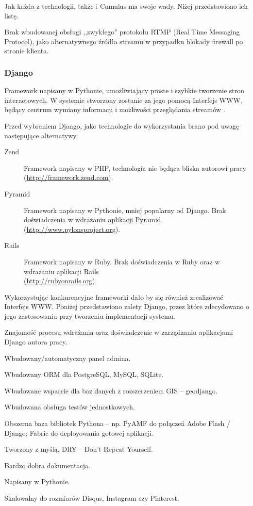 Jak każda z technologii, także i Cumulus ma swoje wady. Niżej przedstawiono ich listę.
\begin{packed_item}
    \item{Brak wbudowanej obsługi ,,zwykłego'' protokołu RTMP (Real Time Messaging Protocol), jako alternatywnego źródła streamu w przypadku blokady firewall po stronie klienta.}
\end{packed_item}

\newpage
\subsubsection{Django}
Framework napisany w Pythonie, umożliwiający proste i szybkie tworzenie stron internetowych. W systemie stworzony zostanie za jego pomocą Interfejs WWW, będący centrum wymiany informacji i możliwości przeglądania streamów \cite{Django}.

Przed wybraniem Django, jako technologie do wykorzystania brano pod uwagę następujące alternatywy.
\begin{description}
    \item[Zend] Framework napisany w PHP, technologia nie będąca bliska autorowi pracy (\url{http://framework.zend.com}). 
    \item[Pyramid] Framework napisany w Pythonie, mniej popularny od Django. Brak doświadczenia w wdrażaniu aplikacji Pyramid (\url{http://www.pylonsproject.org}).
    \item[Rails] Framework napisany w Ruby. Brak doświadczenia w Ruby oraz w wdrażaniu aplikacji Rails
    \\(\url{http://rubyonrails.org}).
\end{description}

Wykorzystując konkurencyjne frameworki dało by się również zrealizować Interfejs WWW. Poniżej przedstawiono zalety Django, przez które zdecydowano o jego zastosowaniu przy tworzeniu implementacji systemu.
\begin{packed_item}
    \item{Znajomość procesu wdrażania oraz doświadczenie w zarządzaniu aplikacjami Django autora pracy.}
    \item{Wbudowany/automatyczny panel admina.}
    \item{Wbudowany ORM dla PostgreSQL, MySQL, SQLite.}
    \item{Wbudowane wsparcie dla baz danych z rozszerzeniem GIS -- geodjango.}
    \item{Wbudowana obsługa testów jednostkowych.}
    \item{Obszerna baza bibliotek Pythona -- np. PyAMF do połączeń Adobe Flash / Django; Fabric do deployowania gotowej aplikacji.}
    \item{Tworzony z myślą, DRY -- Don't Repeat Yourself.}
    \item{Bardzo dobra dokumentacja.}
    \item{Napisany w Pythonie.}
    \item{Skalowalny do rozmiarów Disqus, Instagram czy Pinterest.}
\end{packed_item}

